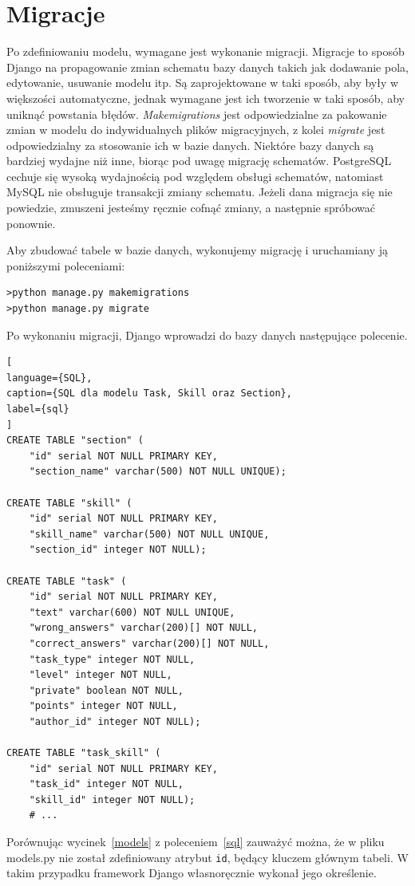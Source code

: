 \documentclass[oneside,polski,logo,indent]{amuthesis}
\begin{document}
\section{Migracje}
Po zdefiniowaniu modelu, wymagane jest wykonanie migracji. Migracje to sposób Django na propagowanie zmian schematu bazy danych takich jak dodawanie pola, edytowanie, usuwanie modelu itp. Są zaprojektowane w taki sposób, aby były w większości automatyczne, jednak wymagane jest ich tworzenie w taki sposób, aby uniknąć powstania błędów. \emph{Makemigrations} jest odpowiedzialne za pakowanie zmian w modelu do indywidualnych plików migracyjnych, z kolei \emph{migrate} jest odpowiedzialny za stosowanie ich w bazie danych.
Niektóre bazy danych są bardziej wydajne niż inne, biorąc pod uwagę migrację schematów. PostgreSQL cechuje się wysoką wydajnością pod względem obsługi schematów, natomiast MySQL nie obsługuje transakcji zmiany schematu. Jeżeli dana migracja się nie powiedzie, zmuszeni jesteśmy ręcznie cofnąć zmiany, a następnie spróbować ponownie. 

Aby zbudować tabele w bazie danych, wykonujemy migrację i uruchamiany ją poniższymi poleceniami: 

\begin{lstlisting}[style=DOS]
>python manage.py makemigrations
>python manage.py migrate
\end{lstlisting}
Po wykonaniu migracji, Django wprowadzi do bazy danych następujące polecenie.
\begin{lstlisting}[
language={SQL},
caption={SQL dla modelu Task, Skill oraz Section},
label={sql}
]
CREATE TABLE "section" (
	"id" serial NOT NULL PRIMARY KEY, 
	"section_name" varchar(500) NOT NULL UNIQUE);

CREATE TABLE "skill" (
	"id" serial NOT NULL PRIMARY KEY, 
	"skill_name" varchar(500) NOT NULL UNIQUE, 
	"section_id" integer NOT NULL);

CREATE TABLE "task" (
	"id" serial NOT NULL PRIMARY KEY, 
	"text" varchar(600) NOT NULL UNIQUE, 
	"wrong_answers" varchar(200)[] NOT NULL, 
	"correct_answers" varchar(200)[] NOT NULL,
	"task_type" integer NOT NULL, 
	"level" integer NOT NULL, 
	"private" boolean NOT NULL, 
	"points" integer NOT NULL, 
	"author_id" integer NOT NULL);

CREATE TABLE "task_skill" (
	"id" serial NOT NULL PRIMARY KEY, 
	"task_id" integer NOT NULL, 
	"skill_id" integer NOT NULL);
	# ...
\end{lstlisting}

Porównując wycinek~\ref{models} z poleceniem~\ref{sql} zauważyć można, że w pliku models.py nie został zdefiniowany atrybut \texttt{id}, będący kluczem głównym tabeli. W takim przypadku framework Django własnoręcznie wykonał jego określenie.
\end{document}
